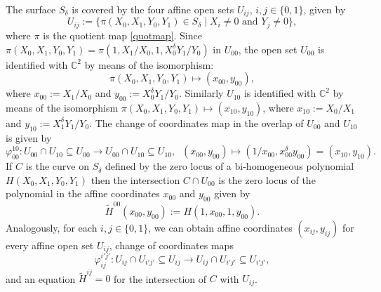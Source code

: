 \documentclass{amsart} %
\theoremstyle{definition}
\begin{document}
The surface $S_{\delta}$ is covered by the four affine open sets $U_{ij}$, $i,j\in \{0,1\}$, given by
\begin{equation}\label{affcov}
 U_{ij}:=\{\pi(X_0,X_1,Y_0,Y_1)\in S_{\delta}\mid X_i\neq 0 \mbox{ and } Y_j\neq 0\},
\end{equation}
where $ \pi $ is the quotient map \eqref{quotmap}.
Since $ \pi(X_0,X_1,Y_0,Y_1) = \pi(1,X_1/X_0,1,X_0^{\delta}Y_1/Y_0) $ in $ U_{00}$, the open set
$U_{00}$ is identified with $\mathbb{C}^2$ by means of the isomorphism:
\[
 \pi(X_0,X_1,Y_0,Y_1)\mapsto (x_{00},y_{00}),
\]
where $x_{00}:=X_1/X_0$ and $y_{00}:=X_0^{\delta}Y_1/Y_0$. Similarly $U_{10}$ is identified with
$\mathbb{C}^2$ by means of the isomorphism $\pi(X_0,X_1,Y_0,Y_1)\mapsto (x_{10},y_{10})$, where
$x_{10}:=X_0/X_1$ and $y_{10}:=X_1^{\delta}Y_1/Y_0$. The change of coordinates map in the overlap
of $U_{00}$ and $U_{10}$ is given by
\[
\varphi_{00}^{10}:U_{00}\cap U_{10}\subseteq U_{00}\rightarrow U_{00}\cap U_{10}\subseteq U_{10},\;\; (x_{00},y_{00})\mapsto (1/x_{00},x_{00}^\delta y_{00})=(x_{10}, y_{10}).
\]
If $C$ is the curve on $S_{\delta}$ defined by the zero
locus of a bi-homogeneous polynomial $H(X_0,X_1,Y_0,Y_1)$ then
the intersection $ C\cap U_{00} $ is the zero locus of the polynomial
in the affine coordinates $x_{00}$ and $y_{00}$ given by
\begin{equation}\label{restriction}
  \tilde{H}^{00}(x_{00},y_{00}):=H(1,x_{00},1,y_{00}).
\end{equation}
Analogously, for each $i,j\in \{0,1\}$, we can obtain affine coordinates
$(x_{ij},y_{ij})$ for every affine open set $U_{ij}$, change of coordinates maps
\begin{equation}\label{chofcoords}
  \varphi_{ij}^{i'j'}:U_{ij}\cap U_{i'j'}\subseteq U_{ij}\rightarrow U_{ij}\cap U_{i'j'}\subseteq U_{i'j'},
\end{equation}
and an equation $\tilde{H}^{ij}=0$ for the intersection of $C$ with $U_{ij}$.
\end{document}
